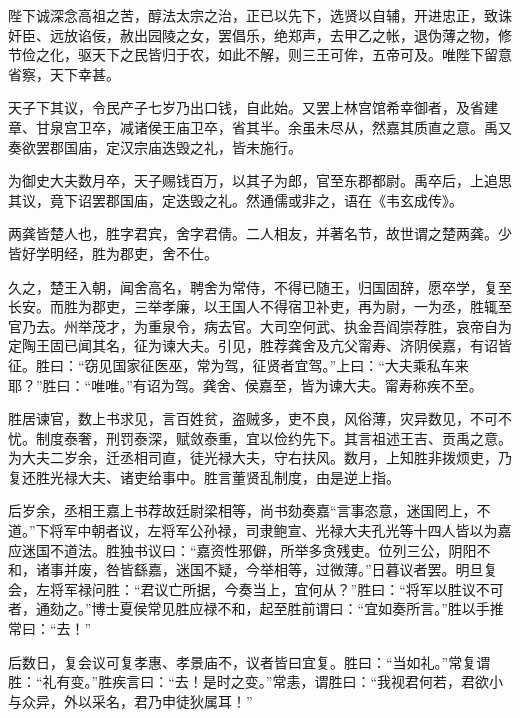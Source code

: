 \documentclass[12pt,UTF8]{ctexbook}
\begin{document}
陛下诚深念高祖之苦，醇法太宗之治，正已以先下，选贤以自辅，开进忠正，致诛奸臣、远放谄佞，赦出园陵之女，罢倡乐，绝郑声，去甲乙之帐，退伪薄之物，修节俭之化，驱天下之民皆归于农，如此不解，则三王可侔，五帝可及。唯陛下留意省察，天下幸甚。



天子下其议，令民产子七岁乃出口钱，自此始。又罢上林宫馆希幸御者，及省建章、甘泉宫卫卒，减诸侯王庙卫卒，省其半。余虽未尽从，然嘉其质直之意。禹又奏欲罢郡国庙，定汉宗庙迭毁之礼，皆未施行。



为御史大夫数月卒，天子赐钱百万，以其子为郎，官至东郡都尉。禹卒后，上追思其议，竟下诏罢郡国庙，定迭毁之礼。然通儒或非之，语在《韦玄成传》。



两龚皆楚人也，胜字君宾，舍字君倩。二人相友，并著名节，故世谓之楚两龚。少皆好学明经，胜为郡吏，舍不仕。



久之，楚王入朝，闻舍高名，聘舍为常侍，不得已随王，归国固辞，愿卒学，复至长安。而胜为郡吏，三举孝廉，以王国人不得宿卫补吏，再为尉，一为丞，胜辄至官乃去。州举茂才，为重泉令，病去官。大司空何武、执金吾阎崇荐胜，哀帝自为定陶王固已闻其名，征为谏大夫。引见，胜荐龚舍及亢父甯寿、济阴侯嘉，有诏皆征。胜曰：“窃见国家征医巫，常为驾，征贤者宜驾。”上曰：“大夫乘私车来耶？”胜曰：“唯唯。”有诏为驾。龚舍、侯嘉至，皆为谏大夫。甯寿称疾不至。



胜居谏官，数上书求见，言百姓贫，盗贼多，吏不良，风俗薄，灾异数见，不可不忧。制度泰奢，刑罚泰深，赋敛泰重，宜以俭约先下。其言祖述王吉、贡禹之意。为大夫二岁余，迁丞相司直，徒光禄大夫，守右扶风。数月，上知胜非拨烦吏，乃复还胜光禄大夫、诸吏给事中。胜言董贤乱制度，由是逆上指。



后岁余，丞相王嘉上书荐故廷尉梁相等，尚书劾奏嘉“言事恣意，迷国罔上，不道。”下将军中朝者议，左将军公孙禄，司隶鲍宣、光禄大夫孔光等十四人皆以为嘉应迷国不道法。胜独书议曰：“嘉资性邪僻，所举多贪残吏。位列三公，阴阳不和，诸事并废，咎皆繇嘉，迷国不疑，今举相等，过微薄。”日暮议者罢。明旦复会，左将军禄问胜：“君议亡所据，今奏当上，宜何从？”胜曰：“将军以胜议不可者，通劾之。”博士夏侯常见胜应禄不和，起至胜前谓曰：“宜如奏所言。”胜以手推常曰：“去！”



后数日，复会议可复孝惠、孝景庙不，议者皆曰宜复。胜曰：“当如礼。”常复谓胜：“礼有变。”胜疾言曰：“去！是时之变。”常恚，谓胜曰：“我视君何若，君欲小与众异，外以采名，君乃申徒狄属耳！”
\end{document}
